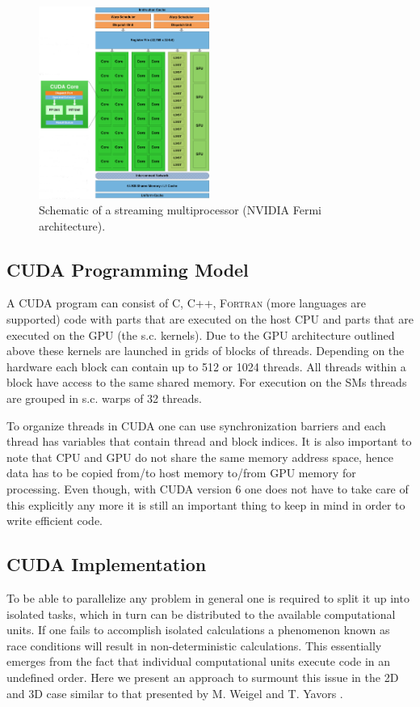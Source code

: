 \documentclass[paper=a4, fontsize=11pt]{scrartcl} %
\numberwithin{equation}{section} %
\numberwithin{figure}{section} %
\numberwithin{table}{section} %
\begin{document}
\begin{figure}
\centering
\includegraphics[width=0.5\textwidth]{images/fermi_sm.png}
\caption{Schematic of a streaming multiprocessor (NVIDIA Fermi architecture)\cite{gpu_nvidia_fermi}.}
\label{fig:fermi_sm}
\end{figure}

\subsection{CUDA Programming Model}
A CUDA program can consist of \textsc{C}, \textsc{C++}, \textsc{Fortran} (more languages are supported) code with parts that are executed on the host CPU and parts that are executed on the GPU (the s.c. kernels). Due to the GPU architecture outlined above these kernels are launched in grids of blocks of threads. Depending on the hardware each block can contain up to 512 or 1024 threads. All threads within a block have access to the same shared memory. For execution on the SMs threads are grouped in s.c. warps of 32 threads.

To organize threads in CUDA one can use synchronization barriers and each thread has variables that contain thread and block indices. It is also important to note that CPU and GPU do not share the same memory address space, hence data has to be copied from/to host memory to/from GPU memory for processing. Even though, with CUDA version 6 one does not have to take care of this explicitly any more it is still an important thing to keep in mind in order to write efficient code.


\subsection{CUDA Implementation}
To be able to parallelize any problem in general one is required to split it up into isolated tasks, which in turn can be distributed to the available computational units. If one fails to accomplish isolated calculations a phenomenon known as race conditions will result in non-deterministic calculations. This essentially emerges from the fact that individual computational units execute code in an undefined order. Here we present an approach to surmount this issue in the 2D and 3D case similar to that presented by M. Weigel and T. Yavors \cite{gpu_mc_spins}.
\end{document}
